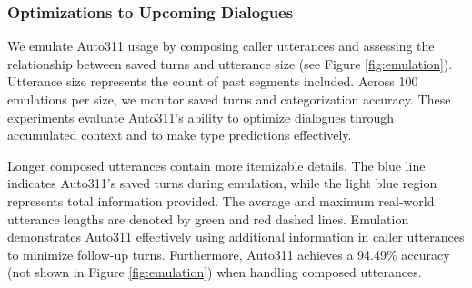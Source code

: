
\subsubsection{Optimizations to Upcoming Dialogues}

We emulate Auto311 usage by composing caller utterances and assessing the relationship between saved turns and utterance size (see Figure \ref{fig:emulation}). Utterance size represents the count of past segments included. Across 100 emulations per size, we monitor saved turns and categorization accuracy. These experiments evaluate Auto311's ability to optimize dialogues through accumulated context and to make type predictions effectively.




Longer composed utterances contain more itemizable details. The blue line indicates Auto311's saved turns during emulation, while the light blue region represents total information provided. The average and maximum real-world utterance lengths are denoted by green and red dashed lines. Emulation demonstrates Auto311 effectively using additional information in caller utterances to minimize follow-up turns. Furthermore, Auto311 achieves a 94.49\% accuracy (not shown in Figure \ref{fig:emulation}) when handling composed utterances.


